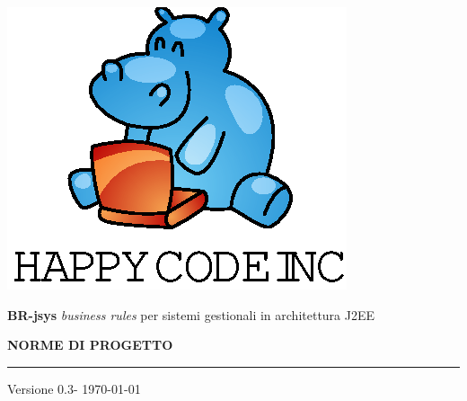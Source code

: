 \documentclass[11pt,titlepage,a4paper]{report}
\begin{document}
\newcommand{\lv}{0.3} %



\begin{titlepage}
\begin{center}
\vspace*{0.5in}
\includegraphics{logo.eps}
\vspace*{0.2in}

{\Large \textbf{BR-jsys}}
{\Large \emph{business rules} per sistemi gestionali in architettura J2EE } 
\vspace{2in}

\LARGE \textbf {NORME DI PROGETTO}
\par\rule{10cm}{0.4pt} \par {\large Versione \lv - \today}


\end{center}
\end{titlepage}
\vspace*{0.5in}
\end{document}
